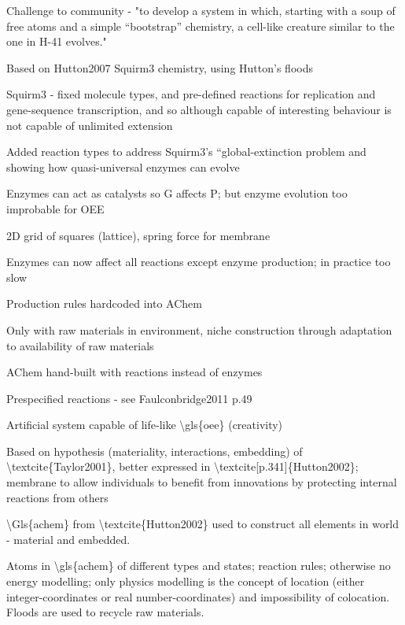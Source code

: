 \autocite{Lucht2012}
		
			Challenge to community - "to develop a system in which, starting with
			a soup of free atoms and a simple ``bootstrap'' chemistry, a cell-like
			creature similar to the one in H-41 evolves."

			Based on Hutton2007 Squirm3 chemistry, using Hutton's floods
			
			Squirm3 - fixed molecule types, and pre-defined reactions for
			replication and gene-sequence transcription, and so although capable
			of interesting behaviour is not capable of unlimited extension
			
			Added reaction types to address Squirm3's ``global-extinction problem
			and showing how quasi-universal enzymes can evolve
		
\autocite{Hutton2007}
		
			Enzymes can act as catalysts so G affects P; but enzyme evolution too
			improbable for OEE
			
			2D grid of squares (lattice), spring force for membrane
						
			Enzymes can now affect all reactions except enzyme production; in
			practice too slow

			Production rules hardcoded into AChem
			

			Only with raw materials in environment, niche construction through
			adaptation to availability of raw materials
			

			
			AChem hand-built with reactions instead of enzymes

			
			Prespecified reactions - see Faulconbridge2011 p.49
			

			
			Artificial system capable of life-like \textbackslash{}gls\{oee\}
			(creativity)

			
			Based on hypothesis (materiality, interactions, embedding) of
			\textbackslash{}textcite\{Taylor2001\}, better expressed in
			\textbackslash{}textcite{[}p.341{]}\{Hutton2002\}; membrane to allow
			individuals to benefit from innovations by protecting internal
			reactions from others
			

			\textbackslash{}Gls\{achem\} from
			\textbackslash{}textcite\{Hutton2002\} used to construct all elements
			in world - material and embedded.

			
			Atoms in \textbackslash{}gls\{achem\} of different types and states;
			reaction rules; otherwise no energy modelling; only physics modelling
			is the concept of location (either integer-coordinates or real
			number-coordinates) and impossibility of colocation. Floods are used
			to recycle raw materials.

